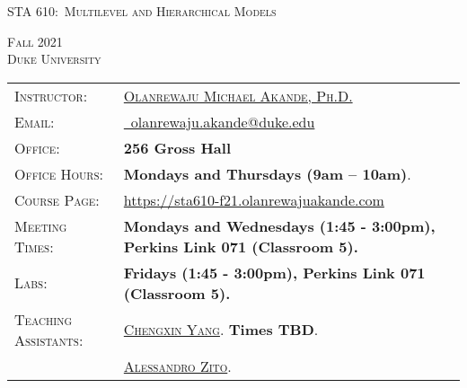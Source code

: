 \documentclass[11pt, a4paper]{article}
\begin{document}
\renewcommand{\arraystretch}{1.5}	


\begin{center}
{\Large \textsc{STA 610:\ Multilevel and Hierarchical Models}}
\end{center}


\begin{center}
	\textsc{Fall 2021} \\
	\textsc{Duke University} \\
\end{center}



\begin{center}
	\begin{minipage}[t]{.95\textwidth}
		\begin{tabular}{@{}L{3cm}L{12.5cm}}
			\toprule[0.065cm]
			\textsc{Instructor:} & \href{https://olanrewajuakande.com}{\textsc{Olanrewaju Michael Akande, Ph.D.}} \\
			\textsc{Email:} &\href{mailto:olanrewaju.akande@duke.edu}{\Envelope ~olanrewaju.akande@duke.edu} \\
			\textsc{Office:} & \textbf{256 Gross Hall} \\
			\textsc{Office Hours:} & \textbf{Mondays and Thursdays (9am -- 10am)}. \\%
			\textsc{Course Page:} & \href{https://sta610-f21.olanrewajuakande.com}{https://sta610-f21.olanrewajuakande.com} \\
			\textsc{Meeting Times:}  & \textbf{Mondays and Wednesdays (1:45 - 3:00pm), Perkins Link 071 (Classroom 5).} \\
			\textsc{Labs:} & \textbf{Fridays (1:45 - 3:00pm), Perkins Link 071 (Classroom 5).} \\
			\textsc{Teaching Assistants:} & \href{https://scholars.duke.edu/person/chengxin.yang}{\textsc{Chengxin Yang}}. 
							\newline \textbf{Times TBD}. \\%
			&\href{https://scholars.duke.edu/person/alessandro.zito}{\textsc{Alessandro Zito}}. 

\end{tabular}
\end{minipage}
\end{center}
\end{document}
